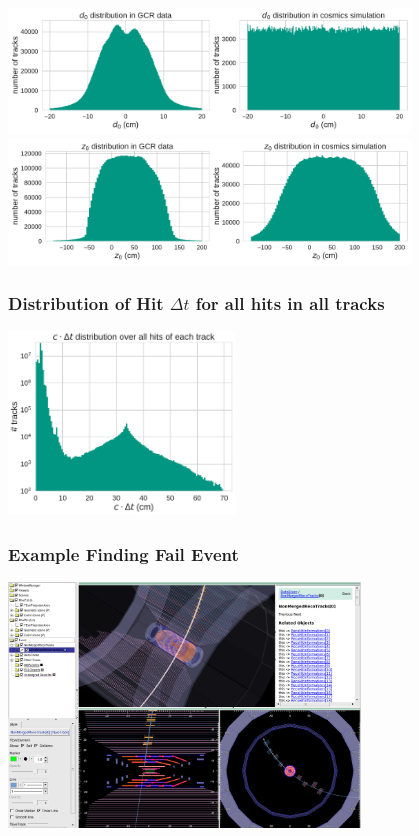 \documentclass[18pt]{beamer}
\begin{document}
  \begin{frame}
    \begin{center}
      \includegraphics[width=0.8\textwidth]{figures/distributions/gcr_d0_distribution_uncut.pdf}\\
      \includegraphics[width=0.8\textwidth]{figures/distributions/gcr_z0_distribution_uncut.pdf}
    \end{center}
  \end{frame}

\begin{frame}
  \frametitle{Distribution of Hit $\Delta t$ for all hits in all tracks}  
    \begin{center}
      \includegraphics[width=0.45\textwidth]{figures/delta_t/gcraugust_delta_t_log.pdf}
  \end{center}
\end{frame}

  \begin{frame}
  \begin{center}
    \frametitle{Example Finding Fail Event}
    \includegraphics[width=0.7\textwidth]{figures/b2display_screenshots/b2display_example_1trackevt.png}
  \end{center}
\end{frame}
\end{document}
